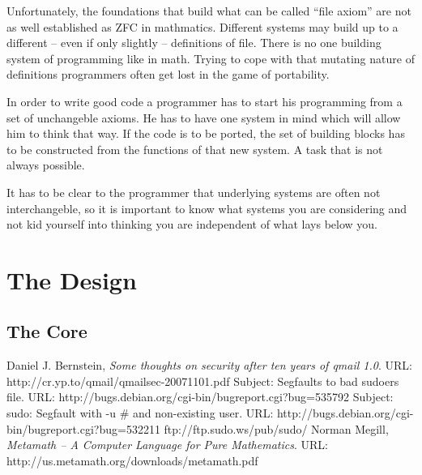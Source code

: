 \documentclass{article}
\begin{document}
Unfortunately, the foundations that build what can be called ``file axiom'' are
not as well established as ZFC in mathmatics. Different systems may build up to a
different -- even if only slightly -- definitions of file. There is no one
building system of programming like in math. Trying to cope with that mutating
nature of definitions programmers often get lost in the game of portability.

In order to write good code a programmer has to start his programming from a set
of unchangeble axioms. He has to have one system in mind which will allow
him to think that way. If the code is to be ported, the set of building blocks
has to be constructed from the functions of that new system. A task that is not
always possible.

It has to be clear to the programmer that underlying systems are often not
interchangeble, so it is important to know what systems you are considering and
not kid yourself into thinking you are independent of what lays below you.


\section{The Design}
\subsection{The Core}

\begin{thebibliography}{9}
 Daniel J. Bernstein, \emph{Some thoughts on security after ten years of qmail
1.0}. URL: http://cr.yp.to/qmail/qmailsec-20071101.pdf
 Subject: Segfaults to bad sudoers file. URL: http://bugs.debian.org/cgi-bin/bugreport.cgi?bug=535792
 Subject: sudo: Segfault with -u \# and non-existing user. URL: http://bugs.debian.org/cgi-bin/bugreport.cgi?bug=532211
 ftp://ftp.sudo.ws/pub/sudo/
 Norman Megill, \emph{Metamath -- A Computer Language for Pure
Mathematics}. URL: http://us.metamath.org/downloads/metamath.pdf
\end{thebibliography}
\end{document}
